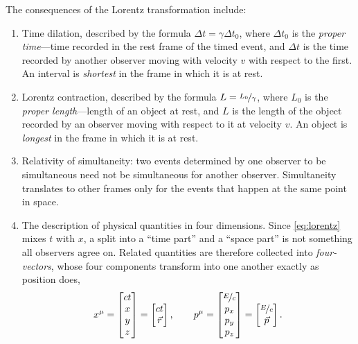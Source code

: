    The consequences of the Lorentz transformation include:
    \begin{enumerate}
        \item Time dilation, described by the formula $\Delta t = \gamma\Delta t_0$, where $\Delta t_0$ is the \emph{proper time}---time recorded in the rest frame of the timed event, and $\Delta t$ is the time recorded by another observer moving with velocity $v$ with respect to the first. An interval is \emph{shortest} in the frame in which it is at rest.
        \item Lorentz contraction, described by the formula $L = \nicefrac{L_0}{\gamma}$, where $L_0$ is the \emph{proper length}---length of an object at rest, and $L$ is the length of the object recorded by an observer moving with respect to it at velocity $v$. An object is \emph{longest} in the frame in which it is at rest.
        \item Relativity of simultaneity: two events determined by one observer to be simultaneous need not be simultaneous for another observer. Simultaneity translates to other frames only for the events that happen at the same point in space.
        \item The description of physical quantities in four dimensions. Since \cref{eq:lorentz} mixes $t$ with $x$, a split into a \enquote{time part} and a \enquote{space part} is not something all observers agree on. Related quantities are therefore collected into \emph{four-vectors}, whose four components transform into one another exactly as position does,
        \begin{equation*}
            x^{\mu} =
            \begin{bmatrix}
                ct \\ x \\ y \\ z
            \end{bmatrix} =
            \begin{bmatrix}
                ct \\ \vec{r}
            \end{bmatrix},
            \qquad
            p^{\mu} =
            \begin{bmatrix}
                \nicefrac{E}{c} \\ p_x \\ p_y \\ p_z
            \end{bmatrix} =
            \begin{bmatrix}
                \nicefrac{E}{c} \\ \vec{p}
            \end{bmatrix}.
        \end{equation*}
        

\end{enumerate}
